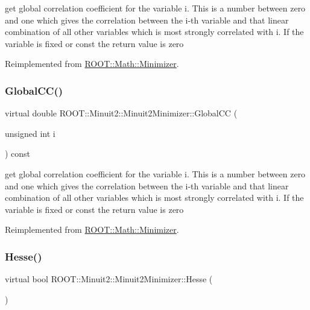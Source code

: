 get global correlation coefficient for the variable i. This is a number between zero and one which gives the correlation between the i-\/th variable and that linear combination of all other variables which is most strongly correlated with i. If the variable is fixed or const the return value is zero 

Reimplemented from \mbox{\hyperlink{classROOT_1_1Math_1_1Minimizer_a6b50b0b0ccb0cb23da281ef978d145c5}{R\+O\+O\+T\+::\+Math\+::\+Minimizer}}.

\mbox{\label{classROOT_1_1Minuit2_1_1Minuit2Minimizer_adde21edb0a67e0eef950049528cfb9a7}} 
\subsubsection{\texorpdfstring{GlobalCC()}{GlobalCC()}\hspace{0.1cm}{\footnotesize\ttfamily [3/3]}}
{\footnotesize\ttfamily virtual double R\+O\+O\+T\+::\+Minuit2\+::\+Minuit2\+Minimizer\+::\+Global\+CC (\begin{DoxyParamCaption}\item[{unsigned int}]{i }\end{DoxyParamCaption}) const\hspace{0.3cm}{\ttfamily [virtual]}}

get global correlation coefficient for the variable i. This is a number between zero and one which gives the correlation between the i-\/th variable and that linear combination of all other variables which is most strongly correlated with i. If the variable is fixed or const the return value is zero 

Reimplemented from \mbox{\hyperlink{classROOT_1_1Math_1_1Minimizer_a6b50b0b0ccb0cb23da281ef978d145c5}{R\+O\+O\+T\+::\+Math\+::\+Minimizer}}.

\mbox{\label{classROOT_1_1Minuit2_1_1Minuit2Minimizer_a0cfd04fde73c157de423705625ede51c}} 
\subsubsection{\texorpdfstring{Hesse()}{Hesse()}\hspace{0.1cm}{\footnotesize\ttfamily [1/3]}}
{\footnotesize\ttfamily virtual bool R\+O\+O\+T\+::\+Minuit2\+::\+Minuit2\+Minimizer\+::\+Hesse (\begin{DoxyParamCaption}{ }\end{DoxyParamCaption})\hspace{0.3cm}{\ttfamily [virtual]}}

